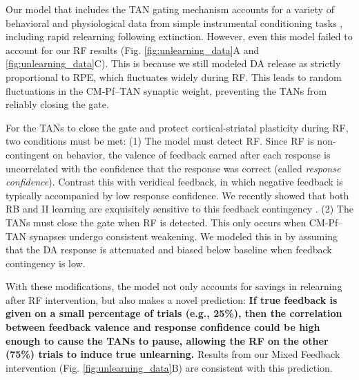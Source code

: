 \documentclass[man,apacite,draftfirst]{apa6}
\begin{document}
Our model that includes the TAN gating mechanism accounts for a variety of
behavioral and physiological data from simple instrumental conditioning tasks
\cite{AshbyCrossley2011, CrossleyEtAl2016}, including rapid relearning following
extinction. However, even this model failed to account for our RF results (Fig.
\ref{fig:unlearning_data}A and \ref{fig:unlearning_data}C). This is because we
still modeled DA release as strictly proportional to RPE, which fluctuates
widely during RF. This leads to random fluctuations in the CM-Pf--TAN synaptic
weight, preventing the TANs from reliably closing the gate.

For the TANs to close the gate and protect cortical-striatal plasticity during
RF, two conditions must be met: (1) The model must detect RF. Since RF is
non-contingent on behavior, the valence of feedback earned after each response
is uncorrelated with the confidence that the response was correct (called
\textit{response confidence}). Contrast this with veridical feedback, in which
negative feedback is typically accompanied by low response confidence. We
recently showed that both RB and II learning are exquisitely sensitive to this
feedback contingency \cite{AshbyVucovich2016}. (2) The TANs must close the gate
when RF is detected. This only occurs when CM-Pf--TAN synapses undergo
consistent weakening. We modeled this in \cite{crossley_erasing_2013} by
assuming that the DA response is attenuated and biased below baseline when
feedback contingency is low.

With these modifications, the model not only accounts for savings in relearning
after RF intervention, but also makes a novel prediction: \textbf{If true
feedback is given on a small percentage of trials (e.g., 25\%), then the
correlation between feedback valence and response confidence could be high
enough to cause the TANs to pause, allowing the RF on the other (75\%) trials to
induce true unlearning.} Results from our Mixed Feedback intervention (Fig.
\ref{fig:unlearning_data}B) are consistent with this prediction.
\end{document}
